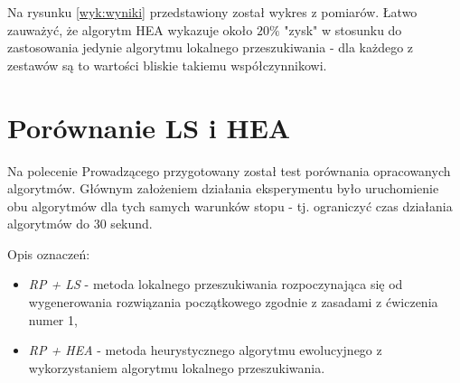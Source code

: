 \documentclass{article}
\begin{document}
Na rysunku \ref{wyk:wyniki} przedstawiony został wykres z pomiarów. Łatwo zauważyć, że algorytm HEA wykazuje około $20\%$ "zysk" w stosunku do zastosowania jedynie algorytmu lokalnego przeszukiwania - dla każdego z zestawów są to wartości bliskie takiemu współczynnikowi.

\section{Porównanie LS i HEA}
Na polecenie Prowadzącego przygotowany został test porównania opracowanych algorytmów. Głównym założeniem działania eksperymentu było uruchomienie obu algorytmów dla tych samych warunków stopu - tj. ograniczyć czas działania algorytmów do 30 sekund.

Opis oznaczeń:
\begin{itemize}
	\item \emph{RP + LS} - metoda lokalnego przeszukiwania rozpoczynająca się od wygenerowania rozwiązania początkowego zgodnie z zasadami z ćwiczenia numer 1,
	\item \emph{RP + HEA} - metoda heurystycznego algorytmu ewolucyjnego z wykorzystaniem algorytmu lokalnego przeszukiwania. 
\end{itemize}

\end{document}
